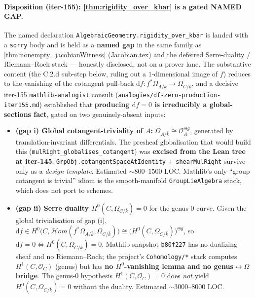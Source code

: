 \paragraph{Disposition (iter-155): \cref{thm:rigidity_over_kbar} is a gated NAMED GAP.} The named declaration \texttt{AlgebraicGeometry.rigidity\_over\_kbar} is landed with a \texttt{sorry} body and is held as a \textbf{named gap} in the same family as \cref{thm:nonempty_jacobianWitness} (Jacobian.tex) and the deferred Serre-duality / Riemann--Roch stack --- honestly disclosed, not on a prover lane. The substantive content (the C.2.d sub-step below, ruling out a \(1\)-dimensional image of \(f\)) reduces to the vanishing of the cotangent pull-back \(\mathrm df \colon f^{*}\Omega_{A/\bar k} \to \Omega_{C/\bar k}\), and a decisive iter-155 \texttt{mathlib-analogist} consult (\texttt{analogies/df-zero-production-iter155.md}) established that \textbf{producing \(\mathrm df = 0\) is irreducibly a global-sections fact}, gated on two genuinely-absent inputs:

\begin{itemize}
  \item \textbf{(gap i) Global cotangent-triviality of \(A\):} \(\Omega_{A/\bar k} \cong \mathcal O_A^{\oplus g}\), generated by translation-invariant differentials. The presheaf globalisation that would build this (\texttt{mulRight\_globalises\_cotangent}) was \textbf{excised from the Lean tree at iter-145}; \texttt{GrpObj.cotangentSpaceAtIdentity} \(+\) \texttt{shearMulRight} survive only as a \emph{design template}. Estimated \(\sim 800\)--\(1500\) LOC. Mathlib's only ``group cotangent is trivial'' idiom is the smooth-manifold \texttt{GroupLieAlgebra} stack, which does not port to schemes.
  \item \textbf{(gap ii) Serre duality \(H^0(C, \Omega_{C/\bar k}) = 0\)} for the genus-\(0\) curve. Given the global trivialisation of gap (i), \(\mathrm df \in H^0\bigl(C, \mathcal{H}om(f^{*}\Omega_{A/\bar k}, \Omega_{C/\bar k})\bigr) \cong \bigl(H^0(C, \Omega_{C/\bar k})\bigr)^{\oplus g}\), so \(\mathrm df = 0 \iff H^0(C, \Omega_{C/\bar k}) = 0\). Mathlib snapshot \texttt{b80f227} has no dualizing sheaf and no Riemann--Roch; the project's \texttt{Cohomology/*} stack computes \(H^1(C, \mathcal O_C)\) (genus) but has \textbf{no \(H^0\)-vanishing lemma and no genus\(\leftrightarrow\Omega\) bridge}. The genus-\(0\) hypothesis \(H^1(C, \mathcal O_C) = 0\) does \emph{not} yield \(H^0(C, \Omega_{C/\bar k}) = 0\) without the duality. Estimated \(\sim 3000\)--\(8000\) LOC.
\end{itemize}

